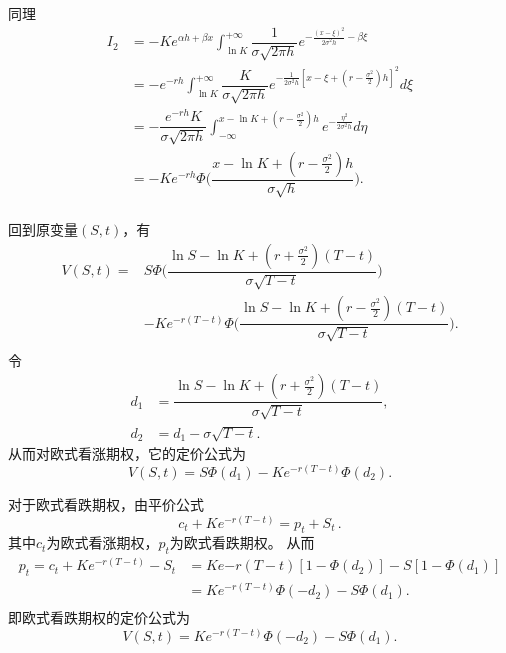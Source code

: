 \documentclass[oneside]{sysuthesis}
\begin{document}
同理
\begin{equation*}
	\begin{split}
		I_2&=-Ke^{\alpha h+\beta x}\int_{\ln K}^{+\infty}\dfrac{1}{\sigma\sqrt{2\pi h}}e^{-\frac{(x-\xi)^2}{2\sigma^2 h}-\beta\xi}\\
		&=-e^{-rh}\int_{\ln K}^{+\infty}\dfrac{K}{\sigma\sqrt{2\pi h}}e^{-\frac{1}{2\sigma^2 h}\left[x-\xi+(r-\frac{\sigma^2}{2})h\right]^2}d\xi\\
		&=-\dfrac{e^{-rh}K}{\sigma\sqrt{2\pi h}}\int_{-\infty}^{x-\ln K+(r-\frac{\sigma^2}{2})h}e^{-\frac{\eta^2}{2\sigma^2 h}}d\eta\\
		&=-Ke^{-rh}\Phi\Big(\dfrac{x-\ln K+(r-\frac{\sigma^2}{2})h}{\sigma\sqrt{h}}\Big).\\
	\end{split}
\end{equation*}

回到原变量$(S,t)$，有
\begin{equation*}
	\begin{split}
		V(S,t)=&S\Phi\Big(\dfrac{\ln S-\ln K+(r+\frac{\sigma^2}{2})(T-t)}{\sigma\sqrt{T-t}}\Big)\\
		&-Ke^{-r(T-t)}\Phi\Big(\dfrac{\ln S-\ln K+(r-\frac{\sigma^2}{2})(T-t)}{\sigma\sqrt{T-t}}\Big).\\
	\end{split}
\end{equation*}
令
\begin{equation*}
	\begin{split}
		d_1&=\dfrac{\ln S-\ln K+(r+\frac{\sigma^2}{2})(T-t)}{\sigma\sqrt{T-t}},\\
		d_2&=d_1-\sigma\sqrt{T-t}.
	\end{split}
\end{equation*}
从而对欧式看涨期权，它的定价公式为
\begin{equation*}
	V(S,t)=S\Phi(d_1)-Ke^{-r(T-t)}\Phi(d_2).
\end{equation*}

对于欧式看跌期权，由平价公式\cite{hull2018}
\begin{equation*}
	c_t+Ke^{-r(T-t)}=p_t+S_t\,.
\end{equation*}
其中$c_t$为欧式看涨期权，$p_t$为欧式看跌期权。
从而
\begin{equation*}
	\begin{split}
		p_t=c_t+Ke^{-r(T-t)}-S_t&=Ke{-r(T-t)}\left[1-\Phi(d_2)\right]-S\left[1-\Phi(d_1)\right]\\
		&=Ke^{-r(T-t)}\Phi(-d_2)-S\Phi(d_1).\\
	\end{split}
\end{equation*}
即欧式看跌期权的定价公式为
\begin{equation*}
	V(S,t)=Ke^{-r(T-t)}\Phi(-d_2)-S\Phi(d_1).
\end{equation*}
\end{document}
